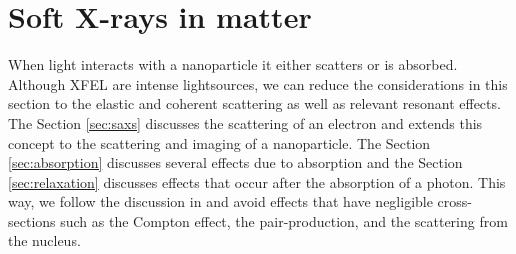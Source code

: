 \section{Soft X-rays in matter}\label{sec:light-matter-interaction}
When light interacts with a nanoparticle it either scatters or is absorbed. Although XFEL are intense lightsources, we can reduce the considerations in this section to the elastic and coherent scattering as well as relevant resonant effects. The Section \ref{sec:saxs} discusses the scattering of an electron and extends this concept to the scattering and imaging of a nanoparticle. The Section \ref{sec:absorption} discusses several effects due to absorption and the Section \ref{sec:relaxation} discusses effects that occur after the absorption of a photon. This way, we follow the discussion in \citep{Als-Nielson-2011-JWS} and avoid effects that have negligible cross-sections such as the Compton effect, the pair-production, and the scattering from the nucleus. 
%
%
%
